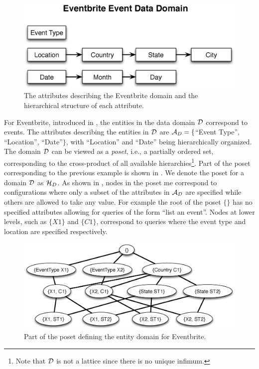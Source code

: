 \begin{figure}[h]
	\begin{center}
	\includegraphics[clip,scale=0.33]{figs/eventsDomain.eps}
	\vspace{-10pt}
	\caption{The attributes describing the Eventbrite domain and the hierarchical structure of each attribute.}
	\label{fig:eventsdomain}
	\end{center}
	\vspace{-20pt}
\end{figure}
\fi
\ifpaper
For Eventbrite, introduced in , the entities in the data domain $\mathcal{D}$ correspond to events. The attributes describing the entities in $\mathcal{D}$ are $\mathcal{A}_D = \{$``Event Type'', ``Location'', ``Date''$\}$, with ``Location'' and ``Date'' being hierarchically organized.
\fi
The domain $\mathcal{D}$ can be viewed as a {\em poset}, i.e., a partially ordered set, corresponding to the cross-product of all available hierarchies\footnote{Note that $\mathcal{D}$ is not a lattice since there is no unique infimum.}. Part of the poset corresponding to the previous example is shown in . We denote the poset for a domain $\mathcal{D}$ as $\mathcal{H}_D$. As shown in , nodes in the poset me correspond to configurations where only a subset of the attributes in $\mathcal{A}_D$ are specified while others are allowed to take any value. For example the root of the poset $\{\}$ has no specified attributes allowing for queries of the form ``list an event''. Nodes at lower levels, such as $\{X1\}$ and $\{C1\}$, correspond to queries where the event type and location are specified respectively. 

\begin{figure}[h]
	\begin{center}
	\includegraphics[clip,scale=0.3]{figs/eventsExLattice.eps}
	\caption{Part of the poset defining the entity domain for Eventbrite.}
	\label{fig:eventslattice}
	\end{center}
\end{figure}

